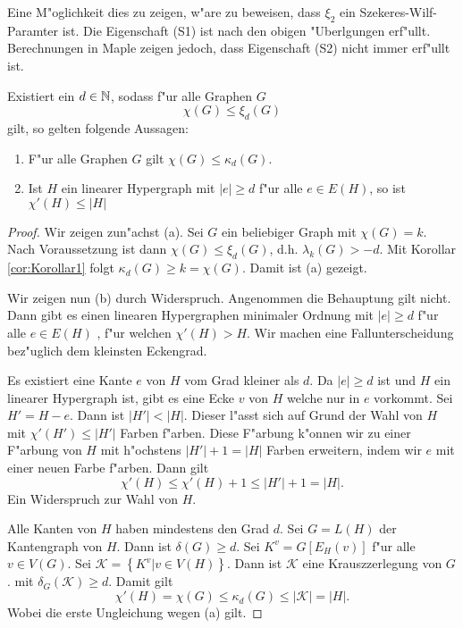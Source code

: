 Eine M"oglichkeit dies zu zeigen, w"are zu beweisen, dass $\xi_2$ ein Szekeres-Wilf-Paramter ist. Die Eigenschaft (S1) ist nach den obigen "Uberlgungen erf"ullt. Berechnungen in Maple zeigen jedoch, dass Eigenschaft (S2) nicht immer erf"ullt ist. 
\begin{theorem}
  \label{thm:MainTheorem}
  Existiert ein $d\in {\mathbb{N}}$, sodass f"ur alle  Graphen $G$ $$\chi(G) \leq \xi_{d}(G)$$ gilt, so gelten folgende Aussagen:
  \begin{enumerate}[label=\rm{(\alph*)}]
    \item F"ur alle Graphen $G$ gilt $\chi(G) \leq \kappa_d (G)$.
    \item  Ist $H$ ein linearer Hypergraph mit $\left|e\right| \geq d$ f"ur alle $e\in E(H)$, so ist $\chi'\left( H \right)\leq \left|H\right| $
  \end{enumerate}
\end{theorem}

\begin{proof}
  Wir zeigen zun"achst (a). Sei $G$ ein beliebiger Graph mit $\chi(G) = k$. Nach Voraussetzung ist dann $\chi(G) \leq \xi_{d}(G)$, d.h. $\lambda_{k}\left( G \right) > -d$. Mit Korollar \ref{cor:Korollar1} folgt $\kappa_{d}\left( G \right) \geq k = \chi\left( G \right)$. 
  Damit ist (a) gezeigt. 

  Wir zeigen nun (b) durch Widerspruch. Angenommen die Behauptung gilt nicht. Dann gibt es einen linearen Hypergraphen minimaler Ordnung mit $|e| \geq d$ f"ur alle $e\in E(H)$ , f"ur welchen $\chi'(H) > H$. 
  Wir machen eine Fallunterscheidung bez"uglich dem kleinsten Eckengrad.
  
   Es existiert eine Kante $e$ von $H$ vom Grad kleiner als $d$. Da $|e| \geq d$ ist und $H$ ein linearer Hypergraph ist, gibt es eine Ecke $v$ von $H$ welche nur in $e$ vorkommt. Sei $H'= H-e$. Dann ist $|H'| < |H|$. Dieser l"asst sich auf Grund der Wahl von $H$ mit $\chi'(H') \leq |H'|$ Farben f"arben. Diese F"arbung k"onnen wir zu einer F"arbung von $H$ mit h"ochstens $|H'|+1 = |H|$ Farben erweitern, indem wir $e$ mit einer neuen Farbe f"arben. Dann gilt 
  $$\chi'(H) \leq \chi'(H) +1  \leq |H'| +1 = |H| .$$ 
  Ein Widerspruch zur Wahl von $H$. 

   Alle Kanten von $H$ haben mindestens den Grad $d$. 
  Sei $G=L(H)$ der Kantengraph von $H$. Dann ist $\delta(G) \geq d$. Sei $K^{v} = G[E_{H}(v)]$ f"ur alle $v\in V(G)$. Sei $\mathcal{K}=\left\{ K^{v} | v \in V(H) \right\}$. Dann ist $\mathcal{K}$ eine Krauszzerlegung von $G$. mit $\delta_{G}(\mathcal{K}) \geq d$. Damit gilt
  \begin{equation*}
    \chi'(H) = \chi(G) \leq \kappa_{d}(G) \leq |\mathcal{K}| = |H|.
  \end{equation*}
  Wobei die erste Ungleichung wegen (a) gilt. 
\end{proof}


